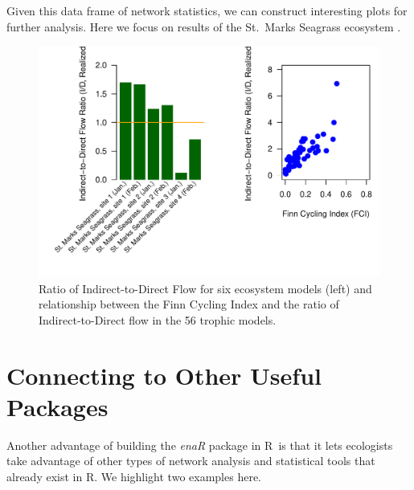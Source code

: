 \documentclass[11pt]{article}
\def\R{\textsf{R}}
\begin{document}
Given this data frame of network statistics, we can construct
interesting plots for further analysis. Here we focus on results of
the St.\ Marks Seagrass ecosystem \citep{baird98}.


\begin{Schunk}
\end{Schunk}


\begin{figure}
  \center
\includegraphics{enaR-047}
\caption{Ratio of Indirect-to-Direct Flow for six ecosystem models
  (left) and relationship between the Finn Cycling Index and the ratio
  of Indirect-to-Direct flow in the 56 trophic models.} \label{fig:aec}
\end{figure}


\section{Connecting to Other Useful Packages}
Another advantage of building the \textit{enaR} package in \R\ is that
it lets ecologists take advantage of other types of network analysis
and statistical tools that already exist in \R.  We highlight two
examples here.
\end{document}
